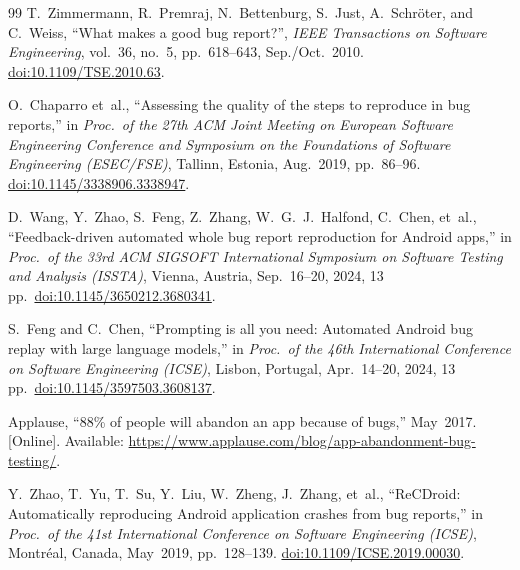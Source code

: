 \documentclass[10pt,conference,a4paper]{IEEEtran}
\begin{document}
  \balance
  \begin{thebibliography}{99}
  T.~Zimmermann, R.~Premraj, N.~Bettenburg, S.~Just, A.~Schr\"oter,
  and C.~Weiss, ``What makes a good bug report?'',
  \emph{IEEE Transactions on Software Engineering}, vol.~36, no.~5,
  pp.~618--643, Sep./Oct.~2010.
  \href{https://doi.org/10.1109/TSE.2010.63}{doi:10.1109/TSE.2010.63}.


  O.~Chaparro et~al.,
  ``Assessing the quality of the steps to reproduce in bug reports,''
  in \emph{Proc.\ of the 27th ACM Joint Meeting on European Software
  Engineering Conference and Symposium on the Foundations of Software
  Engineering (ESEC/FSE)}, Tallinn, Estonia, Aug.~2019, pp.~86--96.
  \href{https://doi.org/10.1145/3338906.3338947}{doi:10.1145/3338906.3338947}.

  D.~Wang, Y.~Zhao, S.~Feng, Z.~Zhang, W.~G.~J.~Halfond, C.~Chen, et~al.,
  ``Feedback-driven automated whole bug report reproduction for Android apps,''
  in \emph{Proc.\ of the 33rd ACM SIGSOFT International Symposium on
  Software Testing and Analysis (ISSTA)},
  Vienna, Austria, Sep.\ 16--20, 2024, 13 pp.\
  \href{https://doi.org/10.1145/3650212.3680341}{doi:10.1145/3650212.3680341}.

  S.~Feng and C.~Chen,
  ``Prompting is all you need: Automated Android bug replay with large
  language models,''
  in \emph{Proc.\ of the 46th International Conference on Software
  Engineering (ICSE)}, Lisbon, Portugal, Apr.\ 14--20, 2024, 13 pp.\
  \href{https://doi.org/10.1145/3597503.3608137}{doi:10.1145/3597503.3608137}.

\bibitem{applause}
  Applause, ``88\% of people will abandon an app because of bugs,''
  May~2017. [Online]. Available:
  \url{https://www.applause.com/blog/app-abandonment-bug-testing/}.


\bibitem{recdroid}
  Y.~Zhao, T.~Yu, T.~Su, Y.~Liu, W.~Zheng, J.~Zhang, et~al.,
  ``ReCDroid: Automatically reproducing Android application crashes from
  bug reports,''
  in \emph{Proc.\ of the 41st International Conference on Software
  Engineering (ICSE)}, Montr\'eal, Canada, May~2019, pp.~128--139.
  \href{https://doi.org/10.1109/ICSE.2019.00030}{doi:10.1109/ICSE.2019.00030}.


\end{thebibliography}
\end{document}
